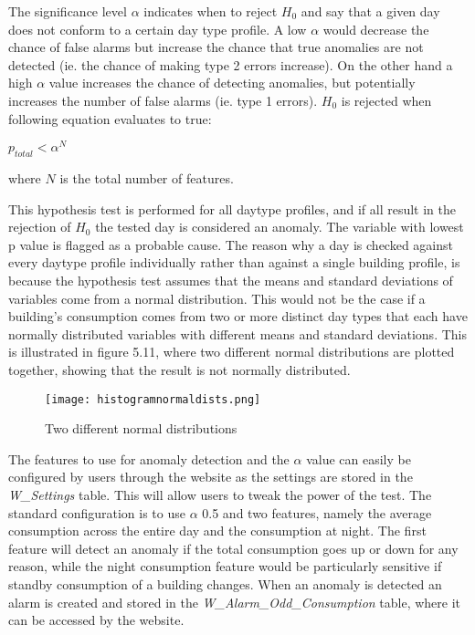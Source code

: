 The significance level $\alpha$ indicates when to reject $H_0$ and say that a given day does not conform to a certain day type profile. A low $\alpha$ would decrease the chance of false alarms but increase the chance that true anomalies are not detected (ie. the chance of making type 2 errors increase). On the other hand a high $\alpha$ value increases the chance of detecting anomalies, but potentially increases the number of false alarms (ie. type 1 errors). $H_0$ is rejected when following equation evaluates to true:
\begin{center}
$p_{total} <\alpha^N$
\end{center}
where $N$ is the total number of features.

This hypothesis test is performed for all daytype profiles, and if all result in the rejection of $H_0$ the tested day is considered an anomaly. The variable with lowest p value is flagged as a probable cause. The reason why a day is checked against every daytype profile individually rather than against a single building profile, is because the hypothesis test assumes that the means and standard deviations of variables come from a normal distribution. This would not be the case if a building's consumption comes from two or more distinct day types that each have normally distributed variables with different means and standard deviations. This is illustrated in figure 5.11, where two different normal distributions are plotted together, showing that the result is not normally distributed.
\begin{figure}
\begin{center}
\texttt{[image: histogramnormaldists.png]}
\end{center}
\caption{Two different normal distributions}
\end{figure}

The features to use for anomaly detection and the $\alpha$ value can easily be configured by users through the website as the settings are stored in the \emph{W\_Settings} table. This will allow users to tweak the power of the test. The standard configuration is to use $\alpha$ 0.5 and two features, namely the average consumption across the entire day and the consumption at night. The first feature will detect an anomaly if the total consumption goes up or down for any reason, while the night consumption feature would be particularly sensitive if standby consumption of a building changes. When an anomaly is detected an alarm is created and stored in the \emph{W\_Alarm\_Odd\_Consumption} table, where it can be accessed by the website.
\newline
